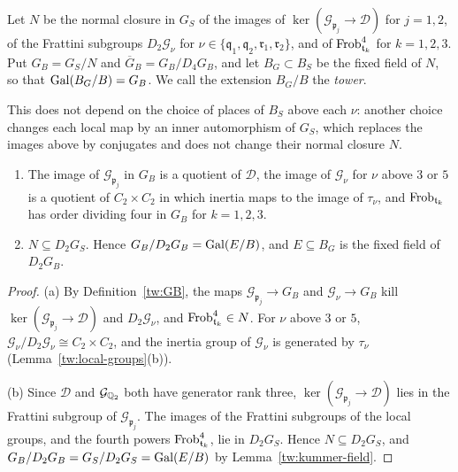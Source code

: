 \begin{definition}\label{tw:GB}
Let $N$ be the normal closure in $G_S$ of the images of
$\ker(\mathcal G_{\mathfrak p_j}\to \mathcal D)$ for $j=1,2$, of the Frattini subgroups
$D_2\mathcal G_\nu$ for $\nu\in\{\mathfrak q_1,\mathfrak q_2,\mathfrak r_1,\mathfrak r_2\}$,
and of $\operatorname{Frob}_{\mathfrak t_k}^4$ for $k=1,2,3$. Put $G_B=G_S/N$ and
$\overline G_B=G_B/D_4G_B$, and let $B_G\subset B_S$ be the fixed field of
$N$, so that $\operatorname{Gal}(B_G/B)=G_B$. We call the extension $B_G/B$ the
\emph{tower}.
\end{definition}

This does not depend on the choice of places of $B_S$ above each $\nu$:
another choice changes each local map by an inner automorphism of $G_S$,
which replaces the images above by conjugates and does not change their
normal closure $N$.

\begin{lemma}\label{tw:GB-basic}
\begin{enumerate}
\item[(a)] The image of $\mathcal G_{\mathfrak p_j}$ in $G_B$ is a quotient of
 $\mathcal D$, the image of $\mathcal G_\nu$ for $\nu$ above $3$ or $5$ is a quotient of
 $C_2\times C_2$ in which inertia maps to the image of $\tau_\nu$, and
 $\operatorname{Frob}_{\mathfrak t_k}$ has order dividing four in $G_B$ for $k=1,2,3$.
\item[(b)] $N\subseteq D_2G_S$. Hence $G_B/D_2G_B=\operatorname{Gal}(E/B)$, and $E\subseteq B_G$
 is the fixed field of $D_2G_B$.
\end{enumerate}
\end{lemma}

\begin{proof}
(a) By Definition~\ref{tw:GB}, the maps $\mathcal G_{\mathfrak p_j}\to G_B$
and $\mathcal G_\nu\to G_B$ kill $\ker(\mathcal G_{\mathfrak p_j}\to \mathcal D)$ and
$D_2\mathcal G_\nu$, and $\operatorname{Frob}_{\mathfrak t_k}^4\in N$. For $\nu$ above $3$
or $5$, $\mathcal G_\nu/D_2\mathcal G_\nu\cong C_2\times C_2$, and the inertia
group of $\mathcal G_\nu$ is generated by $\tau_\nu$
(Lemma~\ref{tw:local-groups}(b)).

(b) Since $\mathcal D$ and $\mathcal G_{\mathbb Q_2}$ both have generator rank three,
$\ker(\mathcal G_{\mathfrak p_j}\to \mathcal D)$ lies in the Frattini subgroup of
$\mathcal G_{\mathfrak p_j}$. The images of the Frattini subgroups of the
local groups, and the fourth powers $\operatorname{Frob}_{\mathfrak t_k}^4$, lie in
$D_2G_S$. Hence $N\subseteq D_2G_S$, and $G_B/D_2G_B=G_S/D_2G_S=\operatorname{Gal}(E/B)$ by
Lemma~\ref{tw:kummer-field}.
\end{proof}

